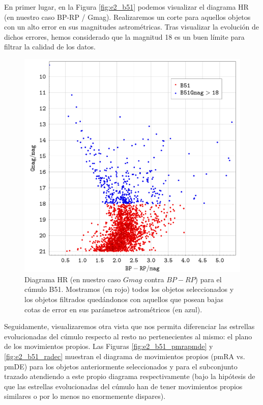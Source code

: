 \documentclass[a4paper,fleqn,usenatbib]{mnras}
\begin{document}
En primer lugar, en la Figura \ref{fig:e2_b51} podemos visualizar el diagrama HR (en nuestro caso BP-RP / Gmag). Realizaremos un corte para aquellos objetos con un alto error en sus magnitudes astrométricas. Tras visualizar la evolución de dichos errores, hemos considerado que la magnitud 18 es un buen límite para filtrar la calidad de los datos.

\begin{figure}
  \includegraphics[width=\linewidth]{img/b51_bprp_gmag}
  \caption{Diagrama HR (en nuestro caso $Gmag$ contra $BP-RP$) para el cúmulo B51. Mostramos (en rojo) todos los objetos seleccionados y los objetos filtrados quedándonos con aquellos que posean bajas cotas de error en sus parámetros astrométricos (en azul).}
  \label{fig:e2_b51_bprpgmag}
\end{figure}

Seguidamente, visualizaremos otra vista que nos permita diferenciar las estrellas evolucionadas del cúmulo respecto al resto no pertenecientes al mismo: el plano de los movimientos propios. Las Figuras \ref{fig:e2_b51_pmrapmde} y \ref{fig:e2_b51_radec} muestran el diagrama de movimientos propios (pmRA vs. pmDE) para los objetos anteriormente seleccionados y para el subconjunto trazado atendiendo a este propio diagrama respectivamente (bajo la hipótesis de que las estrellas evolucionadas del cúmulo han de tener movimientos propios similares o por lo menos no enormemente dispares).
\end{document}
